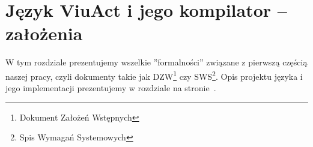\chapter{Język ViuAct i jego kompilator -- założenia}
\label{viuact_zal}

W tym rozdziale prezentujemy wszelkie ''formalności'' związane z pierwszą częścią naszej pracy, czyli
dokumenty takie jak DZW\footnote{Dokument Założeń Wstępnych} czy SWS\footnote{Spis Wymagań Systemowych}.
Opis projektu języka i jego implementacji prezentujemy w rozdziale  na
stronie~\pageref{jezyk_viuact_i_jego_kompilator}.


